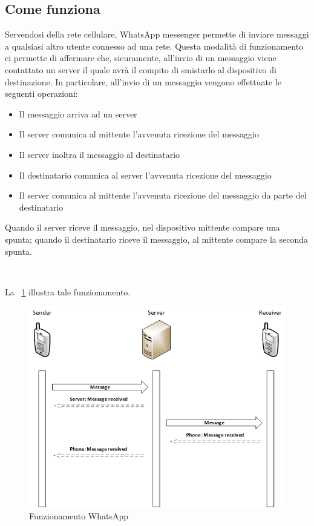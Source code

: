 \documentclass[a4paper,11pt]{book}
\begin{document}
\subsection{Come funziona}
Servendosi della rete cellulare, WhatsApp messenger permette di inviare messaggi a qualsiasi altro utente connesso ad una rete. Questa modalit\`a di funzionamento ci permette di affermare che, sicuramente, all'invio di un messaggio viene contattato un server il quale avr\`a il compito di smistarlo al dispositivo di destinazione.
In particolare, all'invio di un messaggio vengono effettuate le seguenti operazioni:
\begin{itemize}
 \item Il messaggio arriva ad un server
 \item Il server comunica al mittente l'avvenuta ricezione del messaggio
 \item Il server inoltra il messaggio al destinatario
 \item Il destinatario comunica al server l'avvenuta ricezione del messaggio
 \item Il server comunica al mittente l'avvenuta ricezione del messaggio da parte del destinatario
\end{itemize}

Quando il server riceve il messaggio, nel dispositivo mittente compare una spunta; quando il destinatario riceve il messaggio, al mittente compare la seconda spunta.

~

La \figurename ~\ref{fig:WhatsApp} illustra tale funzionamento.
~
\begin{figure}[h!t]
\centering
\includegraphics[scale = 0.8]{rete}
\caption{Funzionamento WhatsApp}
\label{fig:WhatsApp}
\end{figure}
\end{document}
